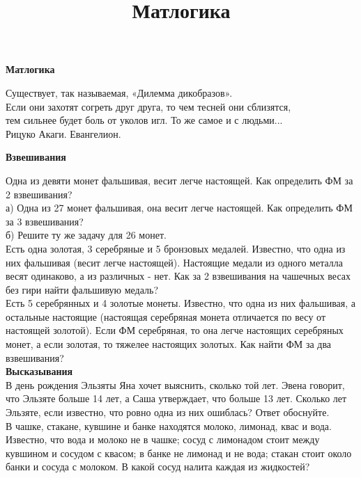 \centerline{\bf \Huge Матлогика}
\title{Матлогика}
\begin{flushright}
    \scriptsize Существует, так называемая, «Дилемма дикобразов». \\Если они захотят согреть друг друга, то чем тесней они сблизятся,\\ тем сильнее будет боль от уколов игл. То же самое и с людьми...\\
    Рицуко Акаги. Евангелион.
\end{flushright}
\textbf{\Large Взвешивания}

Одна из девяти монет фальшивая, весит легче настоящей. Как определить ФМ за 2 взвешивания?\\

а) Одна из 27 монет фальшивая, она весит легче настоящей. Как определить ФМ за 3 взвешивания?\\
б) Решите ту же задачу для 26 монет. \\

Есть одна золотая, 3 серебряные и 5 бронзовых медалей. Известно, что одна из них фальшивая (весит легче настоящей). Настоящие медали из одного металла весят одинаково, а из различных - нет. Как за 2 взвешивания на чашечных весах без гири найти фальшивую медаль?\\

Есть 5 серебрянных и 4 золотые монеты. Известно, что одна из них фальшивая, а остальные настоящие (настоящая серебряная монета отличается по весу от настоящей золотой). Если ФМ серебряная, то она легче настоящих серебряных монет, а если золотая, то тяжелее настоящих золотых. Как найти ФМ за два взвешивания?\\

\textbf{\Large Высказывания}\\

В день рождения Эльзяты Яна хочет выяснить, сколько той лет. Эвена говорит, что Эльзяте больше 14 лет, а Саша утверждает, что больше 13 лет. Сколько лет Эльзяте, если известно, что ровно одна из них ошиблась? Ответ обоснуйте.    \\

В чашке, стакане, кувшине и банке находятся молоко, лимонад, квас и вода. Известно, что вода и молоко не в чашке; сосуд с лимонадом стоит между кувшином и сосудом с 
\newpage
\noindent
квасом; в банке не лимонад и не вода; стакан стоит около банки и сосуда с молоком. В какой сосуд налита каждая из жидкостей?\\

